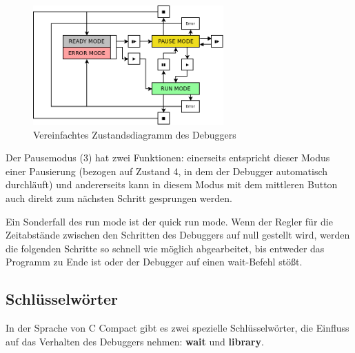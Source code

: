 \begin{figure}[h!]
\centering
\includegraphics[width=0.65\textwidth]{./media/images/gui/debugger/RunModes_Simple.png}
\caption{Vereinfachtes Zustandsdiagramm des Debuggers}
\label{fig:deb-zust-simple}
\end{figure}


Der Pausemodus (3) hat zwei Funktionen: einerseits entspricht dieser Modus einer Pausierung (bezogen auf Zustand 4, in dem der Debugger automatisch durchläuft) und andererseits kann in diesem Modus mit dem mittleren Button auch direkt zum nächsten Schritt gesprungen werden.

Ein Sonderfall des run mode ist der \glqq{}quick run mode\grqq{}. Wenn der Regler für die Zeitabstände zwischen den Schritten des Debuggers auf null gestellt wird, werden die folgenden Schritte so schnell wie möglich abgearbeitet, bis entweder das Programm zu Ende ist oder der Debugger auf einen \glqq{}wait\grqq{}-Befehl stößt.



\subsection{Schlüsselwörter}
In der Sprache von C Compact gibt es zwei spezielle Schlüsselwörter, die Einfluss auf das Verhalten des Debuggers nehmen: \textbf{wait} und \textbf{library}.


